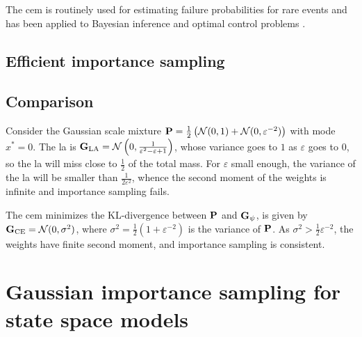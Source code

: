 \begin{theorem}
    
\end{theorem}



The \gls{cem} is routinely used for estimating failure probabilities for rare events \cite{Homem-de-Mello2007Study}  and has been applied to Bayesian inference \cite{Engel2023Bayesian,Ehre2023Certified} and optimal control problems \cite{Kappen2016Adaptive,Zhang2014Applications}.

\subsection{Efficient importance sampling}

\subsection{Comparison}
\begin{example}
  \label{ex:la_failure}
  Consider the Gaussian scale mixture $\P = \frac{1}{2} \left(\mathcal N (0,1) + \mathcal N(0, \varepsilon^{-2})\right)$ with mode $x^{\ast}=0$. 
  The \gls{la} is $\G_{\text{LA}} = \mathcal N \left( 0, \frac{1}{\varepsilon^{2} - \varepsilon + 1} \right)$, whose variance goes to $1$ as $\varepsilon$ goes to $0$, so the \gls{la} will miss close to $\frac 1 2$ of the total mass.
  For $\varepsilon$ small enough, the variance of the \gls{la} will be smaller than $\frac{1}{2\varepsilon^{2}}$, whence the second moment of the weights is infinite and importance sampling fails.

  The \gls{cem} minimizes the KL-divergence between $\P$ and $\G_{\psi}$, is given by $\G_{\text{CE}} = \mathcal N (0, \sigma^{2})$, where $\sigma^{2} = \frac{1}{2}\left( 1 + \varepsilon^{-2} \right)$ is the variance of $\P$.
  As $\sigma^{2} > \frac{1}{2}\varepsilon^{-2}$, the weights have finite second moment, and importance sampling is consistent.
\end{example}

\section{Gaussian importance sampling for state space models}
\label{sec:gaussian_importance_sampling_for_state_space_models}

